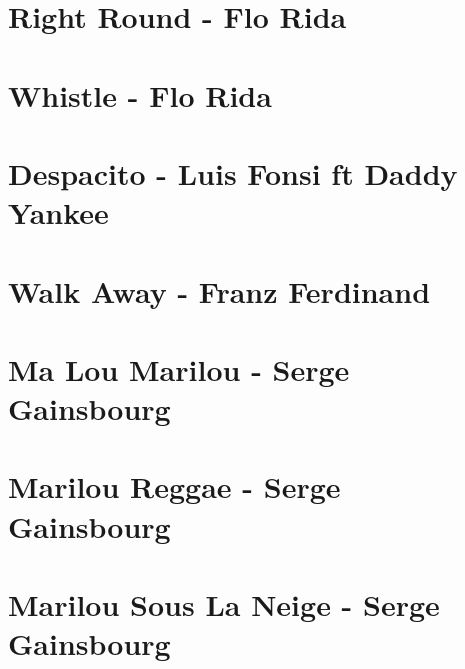 \documentclass[11pt]{article}
\begin{document}
\section{Right Round - Flo Rida}
\begin{guitar}

\end{guitar}


\section{Whistle - Flo Rida}
\begin{guitar}

\end{guitar}

\section{Despacito - Luis Fonsi ft Daddy Yankee}





\section{Walk Away - Franz Ferdinand}
\begin{guitar}

\end{guitar}


\section{Ma Lou Marilou - Serge Gainsbourg}
\begin{guitar}

\end{guitar}

\section{Marilou Reggae - Serge Gainsbourg}
\begin{guitar}

\end{guitar}

\section{Marilou Sous La Neige - Serge Gainsbourg}
\begin{guitar}

\end{guitar}
\end{document}
